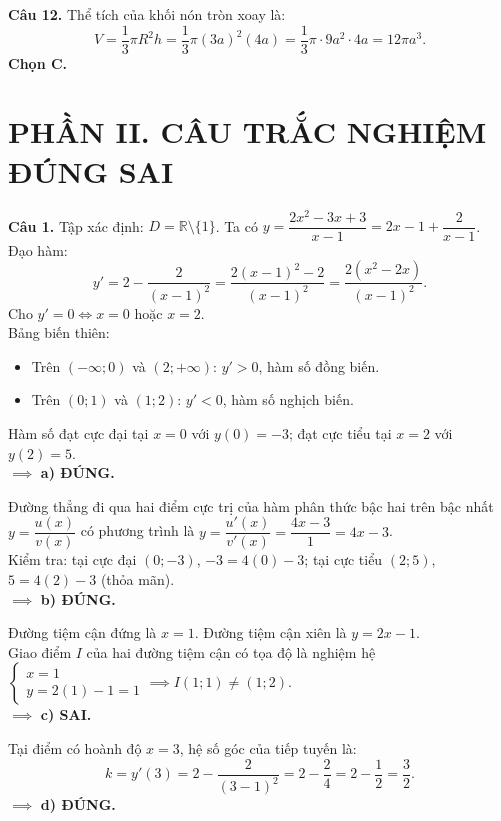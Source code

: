 \documentclass[12pt,a4paper]{article}
\begin{document}
\vspace{0.25cm}
\noindent\textbf{Câu 12.} Thể tích của khối nón tròn xoay là:
\[
V = \dfrac{1}{3}\pi R^2 h = \dfrac{1}{3}\pi (3a)^2 (4a) = \dfrac{1}{3}\pi \cdot 9a^2 \cdot 4a = 12\pi a^3.
\]
\textbf{Chọn C.}

\vspace{0.4cm}
\section*{\large PHẦN II. CÂU TRẮC NGHIỆM ĐÚNG SAI}

\noindent\textbf{Câu 1.}
Tập xác định: $D = \mathbb{R} \setminus \{1\}$. Ta có $y = \dfrac{2x^2 - 3x + 3}{x - 1} = 2x - 1 + \dfrac{2}{x - 1}$.\\
Đạo hàm:
\[
y' = 2 - \dfrac{2}{(x - 1)^2} = \dfrac{2(x - 1)^2 - 2}{(x - 1)^2} = \dfrac{2(x^2 - 2x)}{(x - 1)^2}.
\]
Cho $y' = 0 \iff x = 0$ hoặc $x = 2$.\\
Bảng biến thiên:
\begin{itemize}
    \item Trên $(-\infty; 0)$ và $(2; +\infty)$: $y' > 0$, hàm số đồng biến.
    \item Trên $(0; 1)$ và $(1; 2)$: $y' < 0$, hàm số nghịch biến.
\end{itemize}
Hàm số đạt cực đại tại $x = 0$ với $y(0) = -3$; đạt cực tiểu tại $x = 2$ với $y(2) = 5$.\\
$\implies$ \textbf{a) ĐÚNG.}

Đường thẳng đi qua hai điểm cực trị của hàm phân thức bậc hai trên bậc nhất $y = \dfrac{u(x)}{v(x)}$ có phương trình là $y = \dfrac{u'(x)}{v'(x)} = \dfrac{4x - 3}{1} = 4x - 3$.\\
Kiểm tra: tại cực đại $(0; -3)$, $-3 = 4(0) - 3$; tại cực tiểu $(2; 5)$, $5 = 4(2) - 3$ (thỏa mãn).\\
$\implies$ \textbf{b) ĐÚNG.}

Đường tiệm cận đứng là $x = 1$. Đường tiệm cận xiên là $y = 2x - 1$.\\
Giao điểm $I$ của hai đường tiệm cận có tọa độ là nghiệm hệ $\begin{cases} x = 1 \\ y = 2(1) - 1 = 1 \end{cases} \implies I(1; 1) \ne (1; 2)$.\\
$\implies$ \textbf{c) SAI.}

Tại điểm có hoành độ $x = 3$, hệ số góc của tiếp tuyến là:
\[
k = y'(3) = 2 - \dfrac{2}{(3 - 1)^2} = 2 - \dfrac{2}{4} = 2 - \dfrac{1}{2} = \dfrac{3}{2}.
\]
$\implies$ \textbf{d) ĐÚNG.}
\end{document}
